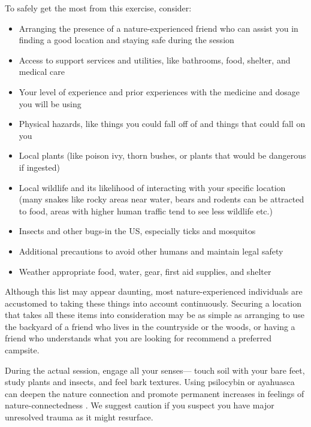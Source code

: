 \documentclass[12pt,letterpaper]{article}
\begin{document}
To safely get the most from this exercise, consider:
\begin{itemize}
    \item Arranging the presence of a nature-experienced friend who can assist you in finding a good location and staying safe during the session
    \item Access to support services and utilities, like bathrooms, food, shelter, and medical care
    \item Your level of experience and prior experiences with the medicine and dosage you will be using
    \item Physical hazards, like things you could fall off of and things that could fall on you
    \item Local plants (like poison ivy, thorn bushes, or plants that would be dangerous if ingested)
    \item Local wildlife and its likelihood of interacting with your specific location (many snakes like rocky areas near water, bears and rodents can be attracted to food, areas with higher human traffic tend to see less wildlife etc.)
    \item Insects and other bugs-in the US, especially ticks and mosquitos
    \item Additional precautions to avoid other humans and maintain legal safety
    \item Weather appropriate food, water, gear, first aid supplies, and shelter
\end{itemize}

Although this list may appear daunting, most nature-experienced individuals are accustomed to taking these things into account continuously. Securing a location that takes all these items into consideration may be as simple as arranging to use the backyard of a friend who lives in the countryside or the woods, or having a friend who understands what you are looking for recommend a preferred campsite.

During the actual session, engage all your senses— touch soil with your bare feet, study plants and insects, and feel bark textures. Using psilocybin or ayahuasca can deepen the nature connection and promote permanent increases in feelings of nature-connectedness \cite{forstmannPsilocybinNature}. We suggest caution if you suspect you have major unresolved trauma as it might resurface.
\end{document}
